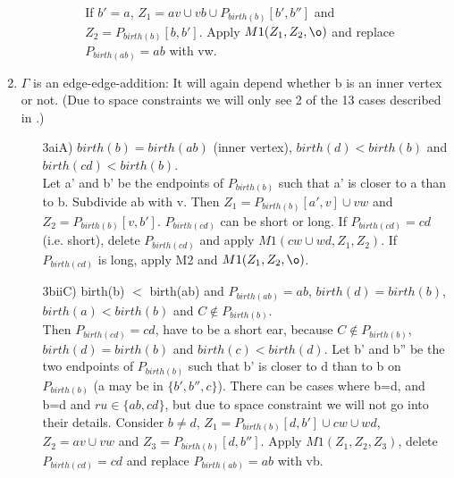 \begin{lem}
\begin{enumerate}
\begin{enumerate}
\begin{enumerate}
\begin{enumerate}
			If $b' = a$,  $Z_1 = av \cup vb \cup P_{birth(b)}[b',b'']$ and $Z_2 = P_{birth(b)}[b,b']$.
			Apply $M1(Z_1,Z_2,\o)$ and replace $P_{birth(ab)} = ab$ with vw.
			\end{enumerate}
		\end{enumerate}
	\end{enumerate}
\item $\Gamma$ is an edge-edge-addition: It will again depend whether b is an inner vertex or not. 
(Due to space constraints we will only see 2 of the 13 cases described in \cite{Schmidt13a}.)
	\begin{enumerate}
	\item[3aiA)] $birth(b)=birth(ab)$ (inner vertex), $birth(d) < birth(b)$ and $birth(cd) < birth(b)$.\\
	Let a' and b' be the endpoints of $P_{birth(b)}$ such that a' is closer to a than to b.
	Subdivide ab with v. Then $Z_1 =  P_{birth(b)}[a',v] \cup vw$ and $Z_2 =  P_{birth(b)}[v,b']$.
	$P_{birth(cd)}$ can be short or long. If $P_{birth(cd)} = cd$ (i.e. short), delete $P_{birth(cd)}$ and apply $M1(cw \cup wd, Z_1, Z_2)$.
	If $P_{birth(cd)}$ is long, apply M2 and $M1(Z_1, Z_2, \o)$.
	\item[3biiC)] birth(b) $<$ birth(ab) and $P_{birth(ab)} = ab$, $birth(d) = birth(b)$, $birth(a) < birth(b)$ and $C \notin P_{birth(b)}$. \\
	Then $P_{birth(cd)} = cd$, have to be a short ear, because $C \notin P_{birth(b)}$, $birth(d) = birth(b)$ and $birth(c) < birth(d)$.
	Let b' and b'' be the two endpoints of $P_{birth(b)}$ such that b' is closer to d than to b on $P_{birth(b)}$ (a may be in $\{b',b'',c\}$).
	There can be cases where b=d, and b=d and $ru\in \{ab,cd\}$, but due to space constraint we will not go into their details.
	Consider $b \neq d$, $Z_1 =  P_{birth(b)}[d,b'] \cup cw \cup wd$, $Z_2 = av \cup vw$ and $Z_3 =  P_{birth(b)}[d,b'']$.
	Apply $M1(Z_1,Z_2,Z_3)$, delete $P_{birth(cd)} = cd$ and replace $P_{birth(ab)} = ab$ with vb.
	\end{enumerate}
\end{enumerate}
\end{lem}

